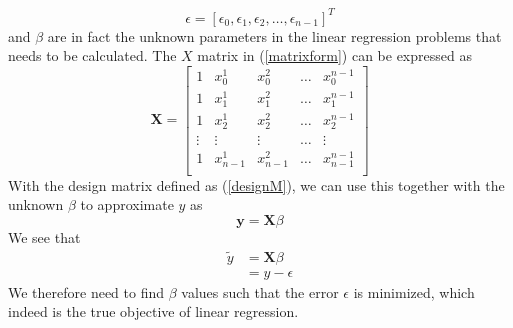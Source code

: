 \documentclass{article}
\begin{document}
\begin{equation}
\epsilon = [\epsilon_{0}, \epsilon_{1}, \epsilon_{2}, \dots, \epsilon_{n-1}]^{T}
\end{equation}
and $\beta$ are in fact the unknown parameters in the linear regression problems that needs to be calculated. The $X$ matrix in (\ref{matrixform}) can be expressed as
\begin{equation} \label{designM}
\textbf{X} = 
\begin{bmatrix}
1 & x_{0}^{1} & x_{0}^{2} & \dots & x_{0}^{n-1} \\
1 & x_{1}^{1} & x_{1}^{2} & \dots & x_{1}^{n-1} \\
1 & x_{2}^{1} & x_{2}^{2} & \dots & x_{2}^{n-1} \\
\vdots & \vdots & \vdots & \dots & \vdots \\
1 & x_{n-1}^{1} & x_{n-1}^{2} & \dots & x_{n-1}^{n-1} \\ 
\end{bmatrix}
\end{equation}
With the design matrix defined as (\ref{designM}), we can use this together with the unknown $\beta$ to approximate $y$ as
\begin{equation}
\textbf{\~{y}} = \textbf{X}\beta
\end{equation}
We see that
\begin{align}
\tilde{y} &= \textbf{X}\beta \\
&= y - \epsilon
\end{align}
We therefore need to find $\beta$ values such that the error $\epsilon$ is minimized, which indeed is the true objective of linear regression.
\end{document}
